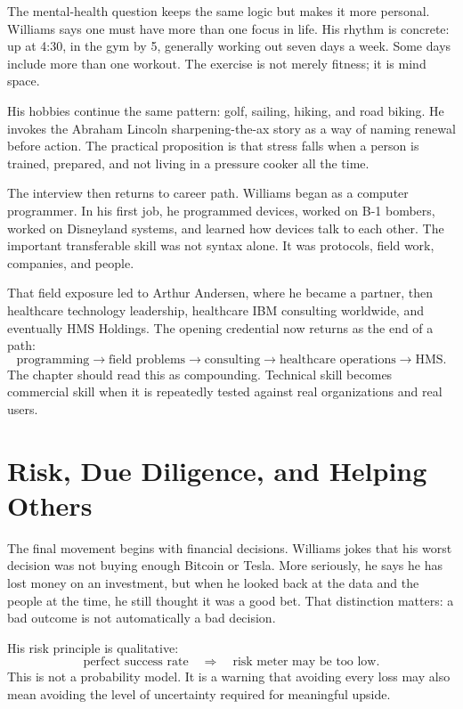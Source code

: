 The mental-health question keeps the same logic but makes it more personal. Williams says one must have more than one focus in life. His rhythm is concrete: up at 4:30, in the gym by 5, generally working out seven days a week. Some days include more than one workout. The exercise is not merely fitness; it is mind space.

His hobbies continue the same pattern: golf, sailing, hiking, and road biking. He invokes the Abraham Lincoln sharpening-the-ax story as a way of naming renewal before action. The practical proposition is that stress falls when a person is trained, prepared, and not living in a pressure cooker all the time.

The interview then returns to career path. Williams began as a computer programmer. In his first job, he programmed devices, worked on B-1 bombers, worked on Disneyland systems, and learned how devices talk to each other. The important transferable skill was not syntax alone. It was protocols, field work, companies, and people.

That field exposure led to Arthur Andersen, where he became a partner, then healthcare technology leadership, healthcare IBM consulting worldwide, and eventually HMS Holdings. The opening credential now returns as the end of a path:
\begin{equation}
\text{programming}
\longrightarrow
\text{field problems}
\longrightarrow
\text{consulting}
\longrightarrow
\text{healthcare operations}
\longrightarrow
\text{HMS}.
\end{equation}
The chapter should read this as compounding. Technical skill becomes commercial skill when it is repeatedly tested against real organizations and real users.

\section{Risk, Due Diligence, and Helping Others}

The final movement begins with financial decisions. Williams jokes that his worst decision was not buying enough Bitcoin or Tesla. More seriously, he says he has lost money on an investment, but when he looked back at the data and the people at the time, he still thought it was a good bet. That distinction matters: a bad outcome is not automatically a bad decision.

His risk principle is qualitative:
\begin{equation}
\text{perfect success rate}
\quad\Rightarrow\quad
\text{risk meter may be too low}.
\end{equation}
This is not a probability model. It is a warning that avoiding every loss may also mean avoiding the level of uncertainty required for meaningful upside.

